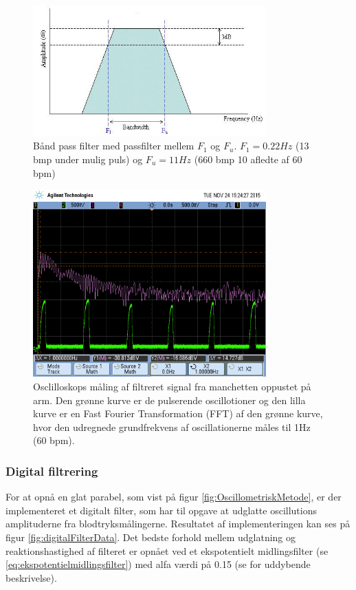 \begin{figure}[H]
	\centering
	\includegraphics[trim={0 0 0 1.5cm},clip, width=0.8\textwidth]{billeder/BandPass_filter.JPG}
	\caption{Bånd pass filter med passfilter mellem $F_1$ og $F_u$. $F_1=0.22Hz$ (13 bmp under mulig puls) og $F_u=11Hz$ (660 bmp 10 afledte af 60 bpm) }\label{fig:BandPassFilter}
\end{figure}

\begin{figure}[H]
	\centering
	\includegraphics[trim={0 2.5cm 0 1.5cm},clip, width=0.8\textwidth]{billeder/filteredPulseSignalWithFFT.png}
	\caption{Osclilloskops måling af filtreret signal fra manchetten oppustet på arm. Den grønne kurve er de pulserende oscillotioner og den lilla kurve er en Fast Fourier Transformation (FFT) af den grønne kurve, hvor den udregnede grundfrekvens af oscillationerne måles til 1Hz (60 bpm).}\label{fig:filteredPulseSignalWithFFT}
\end{figure}

\subsubsection{Digital filtrering}
For at opnå en glat parabel, som vist på  figur \ref{fig:OscillometriskMetode}, er der implementeret et digitalt filter, som har til opgave at udglatte oscillutions amplituderne fra blodtryksmålingerne. Resultatet af implementeringen kan ses på figur \ref{fig:digitalFilterData}. Det bedste forhold mellem udglatning og reaktionshastighed af filteret er opnået ved et ekspotentielt midlingsfilter (se \ref{eq:ekspotentielmidlingsfilter}) med alfa værdi på 0.15 (se  for uddybende beskrivelse).  

